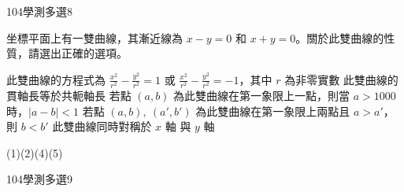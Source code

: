 \begin{QUESTIONS}
\begin{QUESTION}
\begin{QSOLLIST}
\begin{QSOL}
\begin{pspicture*}
				\end{pspicture*}
			\end{QSOL}
        \end{QSOLLIST}
        \begin{QEMPTYSPACE}
        \end{QEMPTYSPACE}
    \end{QUESTION}
    \begin{QUESTION}
        \begin{ExamInfo}{104}{學測}{多選}{8}
        \end{ExamInfo}
        \begin{ExamAnsRateInfo}{48}{71}{49}{24}
        \end{ExamAnsRateInfo}
        \begin{QBODY}
			坐標平面上有一雙曲線，其漸近線為 $x-y=0$ 和 $x+y=0$。關於此雙曲線的性質，請選出正確的選項。
			\begin{QOPS}
				\QOP 此雙曲線的方程式為 $\frac{{{x}^{2}}}{{{r}^{2}}}-\frac{{{y}^{2}}}{{{r}^{2}}}=1$ 或 $\frac{{{x}^{2}}}{{{r}^{2}}}-\frac{{{y}^{2}}}{{{r}^{2}}}=-1$，其中 $r$ 為非零實數
				\QOP 此雙曲線的貫軸長等於共軛軸長
				\QOP 若點 $\left( a,b \right)$ 為此雙曲線在第一象限上一點，則當 $a>1000$ 時，$\left| a-b \right|<1$
				\QOP 若點 $\left( a,b \right),\ \left( a',b' \right)$ 為此雙曲線在第一象限上兩點且 $a>a'$，則 $b<b'$
				\QOP 此雙曲線同時對稱於 $x$ 軸 與 $y$ 軸
			\end{QOPS}
        \end{QBODY}
        \begin{QFROMS}
        \end{QFROMS}
        \begin{QTAGS}\end{QTAGS}
        \begin{QANS}
            (1)(2)(4)(5)
        \end{QANS}
        \begin{QSOLLIST}
        \end{QSOLLIST}
        \begin{QEMPTYSPACE}
        \end{QEMPTYSPACE}
    \end{QUESTION}
    \begin{QUESTION}
        \begin{ExamInfo}{104}{學測}{多選}{9}
        \end{ExamInfo}
        \begin{ExamAnsRateInfo}{49}{77}{45}{25}

\end{ExamAnsRateInfo}
\end{QUESTION}
\end{QUESTIONS}
